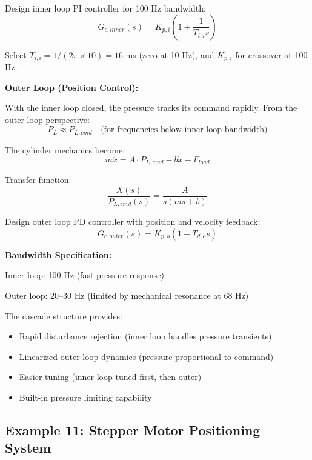 Design inner loop PI controller for 100 Hz bandwidth:
\begin{equation}
    G_{c,inner}(s) = K_{p,i}\left(1 + \frac{1}{T_{i,i} s}\right)
\end{equation}

Select $T_{i,i} = 1/(2\pi \times 10) = 16$ ms (zero at 10 Hz), and $K_{p,i}$ for crossover at 100 Hz.

\textbf{Outer Loop (Position Control):}

With the inner loop closed, the pressure tracks its command rapidly. From the outer loop perspective:
\begin{equation}
    P_L \approx P_{L,cmd} \quad \text{(for frequencies below inner loop bandwidth)}
\end{equation}

The cylinder mechanics become:
\begin{equation}
    m\ddot{x} = A \cdot P_{L,cmd} - b\dot{x} - F_{load}
\end{equation}

Transfer function:
\begin{equation}
    \frac{X(s)}{P_{L,cmd}(s)} = \frac{A}{s(ms + b)}
\end{equation}

Design outer loop PD controller with position and velocity feedback:
\begin{equation}
    G_{c,outer}(s) = K_{p,o}(1 + T_{d,o} s)
\end{equation}

\textbf{Bandwidth Specification:}

Inner loop: 100 Hz (fast pressure response)

Outer loop: 20--30 Hz (limited by mechanical resonance at 68 Hz)

The cascade structure provides:
\begin{itemize}
    \item Rapid disturbance rejection (inner loop handles pressure transients)
    \item Linearized outer loop dynamics (pressure proportional to command)
    \item Easier tuning (inner loop tuned first, then outer)
    \item Built-in pressure limiting capability
\end{itemize}

\subsection{Example 11: Stepper Motor Positioning System}

